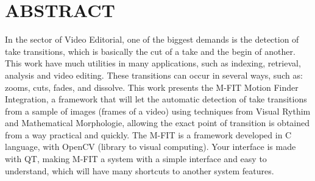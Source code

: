 \chapter*{\centering ABSTRACT \label{abstract}}

\hspace*{1.25cm}In the sector of Video Editorial, one of the biggest
demands is the detection of take transitions, which is basically the
cut of a take and the begin of another. This work have much
utilities in many applications, such as indexing, retrieval,
analysis and video editing. These transitions can occur in several
ways, such as: zooms, cuts, fades, and dissolve. This work presents
the M-FIT Motion Finder Integration, a framework that will let the
automatic detection of take transitions from a sample of images
(frames of a video) using techniques from Visual Rythim and
Mathematical Morphologie, allowing the exact point of transition is
obtained from a way practical and quickly. The M-FIT is a framework
developed in C language, with OpenCV (library to visual computing).
Your interface is made with QT, making M-FIT a system with a simple
interface and easy to understand, which will have many shortcuts to
another system features.
